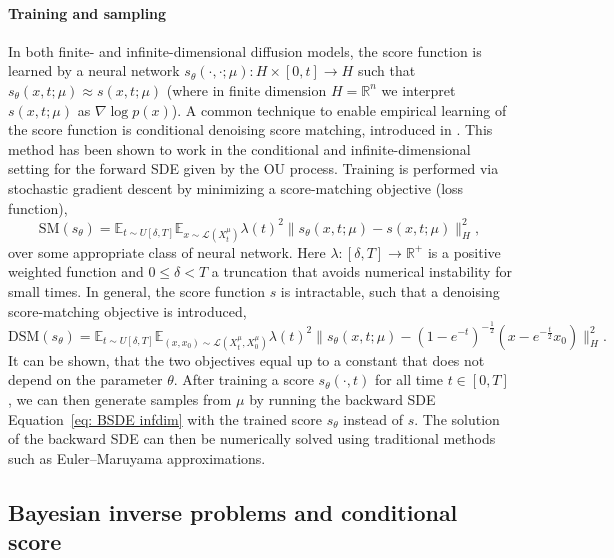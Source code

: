 \documentclass[10pt]{article} %
\def\Eqref#1{Equation~\ref{#1}}
\newcommand{\E}{\mathbb{E}}
\newcommand{\R}{\mathbb{R}}
\theoremstyle{plain}
\theoremstyle{definition}
\theoremstyle{remark}
\renewcommand{\L}{\mathscr{L}}
\begin{document}
\paragraph{Training and sampling}
In both finite- and infinite-dimensional diffusion models, the score function is learned by a neural network $s_\theta(\cdot,\cdot;\mu): H \times [0,t] \to H$ such that $s_\theta(x,t; \mu) \approx s(x,t;\mu)$ (where in finite dimension $H=\R^n$ we interpret $s(x,t;\mu)$ as $ \nabla\log p(x)$). 
A common technique to enable empirical learning of the score function is conditional denoising score matching, introduced in \cite{Vincent2011ACB-Loss-function}. This method has been shown to work in the conditional \cite{batzolis2021conditional} and infinite-dimensional setting \cite{baldassari2024conditional}  for the forward SDE given by the OU process. 
Training is performed via stochastic gradient descent by minimizing a score-matching objective (loss function),
\begin{equation}
    \mathrm{SM}(s_\theta) = \E_{t \sim U[\delta, T]} \E_{x \sim \L(X_t^\mu)} \lambda(t)^2\|s_\theta(x,t; \mu) - s(x,t;\mu)\|^2_H,
\end{equation}
over some appropriate class of neural network. Here $\lambda: [\delta,T] \to \R^+$ is a positive weighted function and $0 \le \delta < T$ a truncation that avoids numerical instability for small times. 
In general, the score function $s$ is intractable, such that a denoising score-matching objective is introduced,
\begin{equation*}
    \mathrm{DSM}(s_\theta) = \E_{t \sim U[\delta, T]} \E_{(x, x_0) \sim \L(X_t^\mu, X_0^\mu)} \lambda(t)^2\|s_\theta(x,t; \mu) - (1-e^{-t})^{-\frac{1}{2}}(x - e^{-\frac{t}{2}}x_0)\|^2_H.
\end{equation*}
It can be shown, that the two objectives equal up to a constant that does not depend on the parameter $\theta$. 
After training a score $s_\theta(\cdot,t)$ for all time $t\in [0,T]$, we can then generate samples from $\mu$ by running the backward SDE \Eqref{eq: BSDE infdim} with the trained score $s_\theta$ instead of $s$. The solution of the backward SDE can then be numerically solved using traditional methods such as Euler--Maruyama approximations.

\subsection{Bayesian inverse problems and conditional score}
\end{document}
